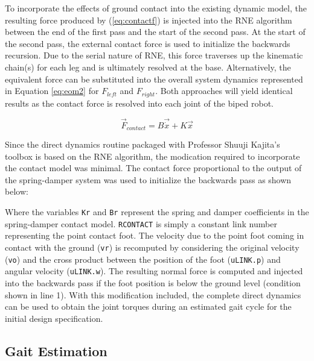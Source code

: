 To incorporate the effects of ground contact into the existing dynamic model, the resulting force produced by (\ref{eq:contactf}) is injected into the RNE algorithm between the end of the first pass and the start of the second pass. At the start of the second pass, the external contact force is used to initialize the backwards recursion. Due to the serial nature of RNE, this force traverses up the kinematic chain(s) for each leg and is ultimately resolved at the base. Alternatively, the equivalent force can be substituted into the overall system dynamics represented in Equation \ref{eq:eom2} for $F_{left}$ and $F_{right}$. Both approaches will yield identical results as the contact force is resolved into each joint of the biped robot. 

\begin{equation}
	\label{eq:contactf}
	\vec{F}_{contact} = B\vec{\dot{x}} + K\vec{x}
\end{equation}

Since the direct dynamics routine packaged with Professor Shuuji Kajita's toolbox is based on the RNE algorithm, the modication required to incorporate the contact model was minimal. The contact force proportional to the output of the spring-damper system was used to initialize the backwards pass as shown below: 



Where the variables \texttt{Kr} and \texttt{Br} represent the spring and damper coefficients in the spring-damper contact model. \texttt{RCONTACT} is simply a constant link number representing the point contact foot. The velocity due to the point foot coming in contact with the ground (\texttt{vr}) is recomputed by considering the original velocity (\texttt{vo}) and the cross product between the position of the foot (\texttt{uLINK.p}) and angular velocity (\texttt{uLINK.w}). The resulting normal force is computed and injected into the backwards pass if the foot position is below the ground level (condition shown in line 1). With this modification included, the complete direct dynamics can be used to obtain the joint torques during an estimated gait cycle for the initial design specification.   



\subsection{Gait Estimation} %
\label{sec:gait_estimation}
	
